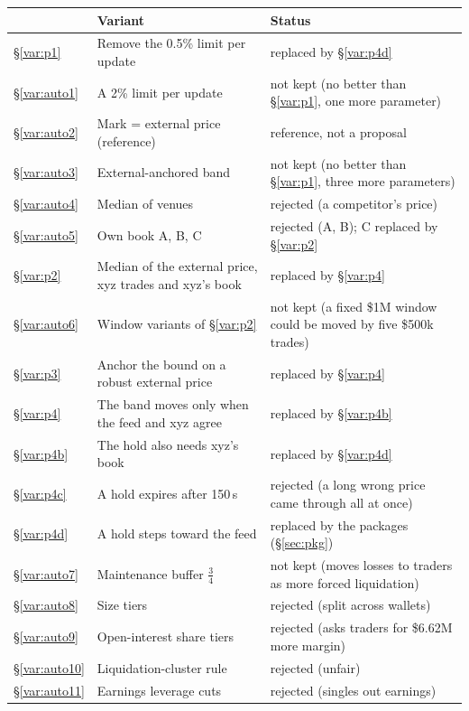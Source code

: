 \documentclass[10.5pt,a4paper]{article}
\begin{document}
{\footnotesize\renewcommand{\arraystretch}{1.0}\begin{xltabular}{\textwidth}{@{}l>{\raggedright\arraybackslash}X>{\raggedright\arraybackslash}p{5.2cm}@{}}
\toprule
 & Variant & Status\\
\midrule
\endhead
\S\ref{var:p1} & Remove the 0.5\% limit per update & replaced by \S\ref{var:p4d}\\
\S\ref{var:auto1} & A 2\% limit per update & not kept (no better than \S\ref{var:p1}, one more parameter)\\
\S\ref{var:auto2} & Mark = external price (reference) & reference, not a proposal\\
\S\ref{var:auto3} & External-anchored band & not kept (no better than \S\ref{var:p1}, three more parameters)\\
\S\ref{var:auto4} & Median of venues & rejected (a competitor's price)\\
\S\ref{var:auto5} & Own book A, B, C & rejected (A, B); C replaced by \S\ref{var:p2}\\
\S\ref{var:p2} & Median of the external price, xyz trades and xyz's book & replaced by \S\ref{var:p4}\\
\S\ref{var:auto6} & Window variants of \S\ref{var:p2} & not kept (a fixed \$1M window could be moved by five \$500k trades)\\
\S\ref{var:p3} & Anchor the bound on a robust external price & replaced by \S\ref{var:p4}\\
\S\ref{var:p4} & The band moves only when the feed and xyz agree & replaced by \S\ref{var:p4b}\\
\S\ref{var:p4b} & The hold also needs xyz's book & replaced by \S\ref{var:p4d}\\
\S\ref{var:p4c} & A hold expires after 150\,s & rejected (a long wrong price came through all at once)\\
\S\ref{var:p4d} & A hold steps toward the feed & replaced by the packages (\S\ref{sec:pkg})\\
\S\ref{var:auto7} & Maintenance buffer \texorpdfstring{$\tfrac34$}{3/4} & not kept (moves losses to traders as more forced liquidation)\\
\S\ref{var:auto8} & Size tiers & rejected (split across wallets)\\
\S\ref{var:auto9} & Open-interest share tiers & rejected (asks traders for \$6.62M more margin)\\
\S\ref{var:auto10} & Liquidation-cluster rule & rejected (unfair)\\
\S\ref{var:auto11} & Earnings leverage cuts & rejected (singles out earnings)\\

\end{xltabular}}
\end{document}

